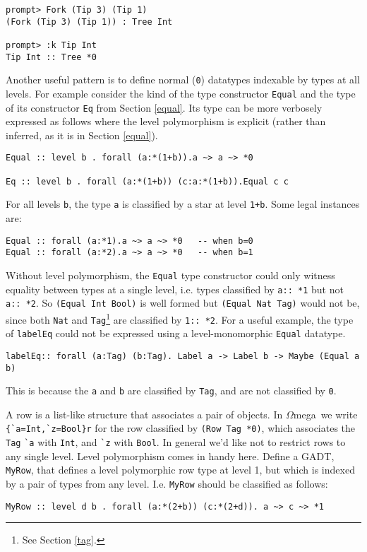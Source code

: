 \documentclass[11pt,twoside,A4]{llncs}
\newcommand{\om}{\emph{$\Omega$}mega}
\begin{document}
{\small
\begin{verbatim}
prompt> Fork (Tip 3) (Tip 1)
(Fork (Tip 3) (Tip 1)) : Tree Int

prompt> :k Tip Int
Tip Int :: Tree *0 
\end{verbatim}}

Another useful pattern is to define normal ({\tt *0}) datatypes indexable
by types at all levels. For example consider the kind of the type constructor
{\tt Equal} and the type of its constructor {\tt Eq} from Section \ref{equal}.
Its type can be more verbosely expressed as follows where the level polymorphism
is explicit (rather than inferred, as it is in Section \ref{equal}).

{\small
\begin{verbatim}
Equal :: level b . forall (a:*(1+b)).a ~> a ~> *0

Eq :: level b . forall (a:*(1+b)) (c:a:*(1+b)).Equal c c
\end{verbatim}}
\noindent
For all levels {\tt b}, the type {\tt a} is classified by
a star at level {\tt 1+b}. Some legal instances are:
{\small
\begin{verbatim}
Equal :: forall (a:*1).a ~> a ~> *0   -- when b=0
Equal :: forall (a:*2).a ~> a ~> *0   -- when b=1
\end{verbatim}}
\noindent
Without level polymorphism, the {\tt Equal} type constructor could only
witness equality between types at a single level, i.e. types classified by
{\tt a:: *1} but not {\tt a:: *2}. So {\tt (Equal Int Bool)} is well formed
but {\tt (Equal Nat Tag)} would not be, since both {\tt Nat}
and {\tt Tag}\footnote{See Section \ref{tag}.} are classified by {\tt *1:: *2}. For a useful
example, the type of {\tt labelEq} could not be expressed
using a level-monomorphic {\tt Equal} datatype.

{\small
\begin{verbatim}
labelEq:: forall (a:Tag) (b:Tag). Label a -> Label b -> Maybe (Equal a b)
\end{verbatim}}
\noindent
This is because the {\tt a} and {\tt b} are classified by {\tt Tag}, and are
not classified by {\tt *0}.

\begin{exercise} \label{ExRow}
A row is a list-like structure that associates
a pair of objects. In \om\ we write \verb+{`a=Int,`z=Bool}r+ for the
row classified by {\tt (Row Tag *0)}, which associates the {\tt Tag}
\verb+`a+ with \verb+Int+, and \verb+`z+ with \verb+Bool+.
In general we'd like not to restrict rows to any single level.
Level polymorphism comes in handy here. Define a GADT, {\tt MyRow},
that defines a level polymorphic row type at level 1, but which
is indexed by a pair of types from any level. I.e.
{\tt MyRow} should be classified as follows:

{\small
\begin{verbatim}
MyRow :: level d b . forall (a:*(2+b)) (c:*(2+d)). a ~> c ~> *1
\end{verbatim} }
\end{exercise}
\end{document}
